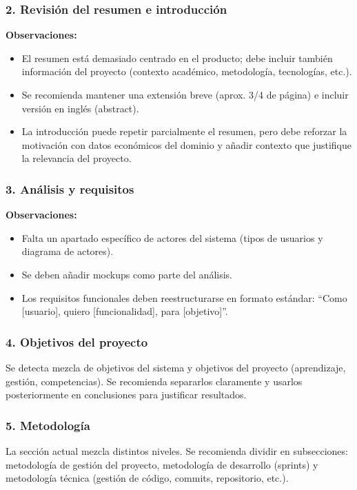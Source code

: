 \subsubsection*{2. Revisión del resumen e introducción}

\textbf{Observaciones:}
\begin{itemize}
    \item El resumen está demasiado centrado en el producto; debe incluir también información del proyecto (contexto académico, metodología, tecnologías, etc.).
    \item Se recomienda mantener una extensión breve (aprox. 3/4 de página) e incluir versión en inglés (abstract).
    \item La introducción puede repetir parcialmente el resumen, pero debe reforzar la motivación con datos económicos del dominio y añadir contexto que justifique la relevancia del proyecto.
\end{itemize}

\subsubsection*{3. Análisis y requisitos}

\textbf{Observaciones:}
\begin{itemize}
    \item Falta un apartado específico de actores del sistema (tipos de usuarios y diagrama de actores).
    \item Se deben añadir mockups como parte del análisis.
    \item Los requisitos funcionales deben reestructurarse en formato estándar: ``Como [usuario], quiero [funcionalidad], para [objetivo]''.
\end{itemize}

\subsubsection*{4. Objetivos del proyecto}
Se detecta mezcla de objetivos del sistema y objetivos del proyecto (aprendizaje, gestión, competencias). Se recomienda separarlos claramente y usarlos posteriormente en conclusiones para justificar resultados.

\subsubsection*{5. Metodología}
La sección actual mezcla distintos niveles. Se recomienda dividir en subsecciones: metodología de gestión del proyecto, metodología de desarrollo (sprints) y metodología técnica (gestión de código, commits, repositorio, etc.).

